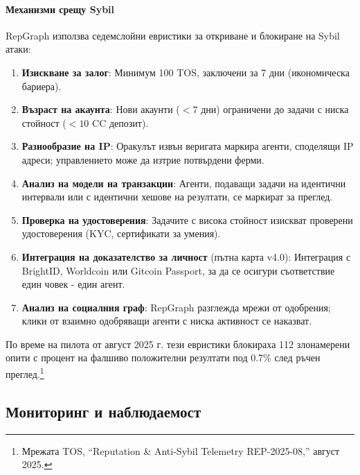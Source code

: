 \documentclass[11pt]{article}
\begin{document}
\paragraph{Механизми срещу Sybil} RepGraph използва седемслойни евристики за откриване и блокиране на Sybil атаки:
\begin{enumerate}[noitemsep]
  \item \textbf{Изискване за залог}: Минимум 100 TOS, заключени за 7 дни (икономическа бариера).
  \item \textbf{Възраст на акаунта}: Нови акаунти ($<7$ дни) ограничени до задачи с ниска стойност ($<10$ CC депозит).
  \item \textbf{Разнообразие на IP}: Оракулът извън веригата маркира агенти, споделящи IP адреси; управлението може да изтрие потвърдени ферми.
  \item \textbf{Анализ на модели на транзакции}: Агенти, подаващи задачи на идентични интервали или с идентични хешове на резултати, се маркират за преглед.
  \item \textbf{Проверка на удостоверения}: Задачите с висока стойност изискват проверени удостоверения (KYC, сертификати за умения).
  \item \textbf{Интеграция на доказателство за личност} (пътна карта v4.0): Интеграция с BrightID, Worldcoin или Gitcoin Passport, за да се осигури съответствие един човек - един агент.
  \item \textbf{Анализ на социалния граф}: RepGraph разглежда мрежи от одобрения; клики от взаимно одобряващи агенти с ниска активност се наказват.
\end{enumerate}
По време на пилота от август 2025 г. тези евристики блокираха 112 злонамерени опити с процент на фалшиво положителни резултати под 0.7\% след ръчен преглед.\footnote{Мрежата TOS, ``Reputation \& Anti-Sybil Telemetry REP-2025-08,'' август 2025.}

\subsection{Мониторинг и наблюдаемост}
\end{document}

